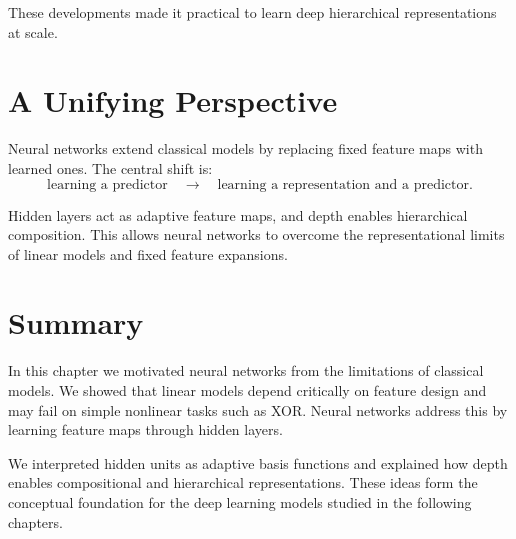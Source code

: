 These developments made it practical to learn deep hierarchical representations at scale.

\section{A Unifying Perspective}

Neural networks extend classical models by replacing fixed feature maps with learned ones. The central shift is:
\[
\text{learning a predictor} \quad \longrightarrow \quad \text{learning a representation and a predictor}.
\]

Hidden layers act as adaptive feature maps, and depth enables hierarchical composition. This allows neural networks to overcome the representational limits of linear models and fixed feature expansions.

\section{Summary}

In this chapter we motivated neural networks from the limitations of classical models. We showed that linear models depend critically on feature design and may fail on simple nonlinear tasks such as XOR. Neural networks address this by learning feature maps through hidden layers.

We interpreted hidden units as adaptive basis functions and explained how depth enables compositional and hierarchical representations. These ideas form the conceptual foundation for the deep learning models studied in the following chapters.